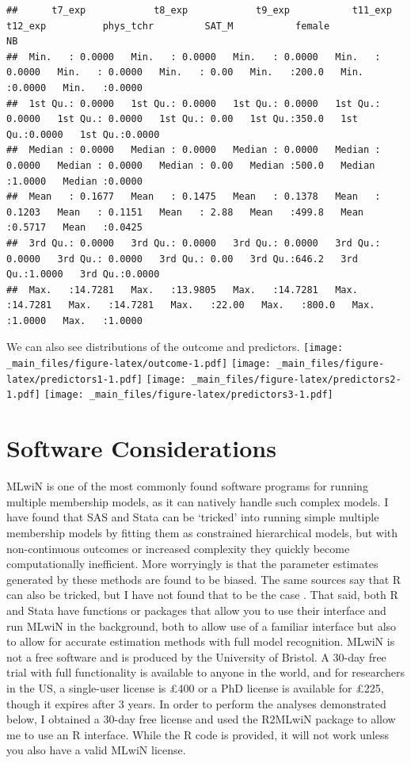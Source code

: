 \documentclass[
]{book}
\begin{document}
\begin{verbatim}
##      t7_exp            t8_exp            t9_exp           t11_exp           t12_exp          phys_tchr         SAT_M           female             NB        
##  Min.   : 0.0000   Min.   : 0.0000   Min.   : 0.0000   Min.   : 0.0000   Min.   : 0.0000   Min.   : 0.00   Min.   :200.0   Min.   :0.0000   Min.   :0.0000  
##  1st Qu.: 0.0000   1st Qu.: 0.0000   1st Qu.: 0.0000   1st Qu.: 0.0000   1st Qu.: 0.0000   1st Qu.: 0.00   1st Qu.:350.0   1st Qu.:0.0000   1st Qu.:0.0000  
##  Median : 0.0000   Median : 0.0000   Median : 0.0000   Median : 0.0000   Median : 0.0000   Median : 0.00   Median :500.0   Median :1.0000   Median :0.0000  
##  Mean   : 0.1677   Mean   : 0.1475   Mean   : 0.1378   Mean   : 0.1203   Mean   : 0.1151   Mean   : 2.88   Mean   :499.8   Mean   :0.5717   Mean   :0.0425  
##  3rd Qu.: 0.0000   3rd Qu.: 0.0000   3rd Qu.: 0.0000   3rd Qu.: 0.0000   3rd Qu.: 0.0000   3rd Qu.: 0.00   3rd Qu.:646.2   3rd Qu.:1.0000   3rd Qu.:0.0000  
##  Max.   :14.7281   Max.   :13.9805   Max.   :14.7281   Max.   :14.7281   Max.   :14.7281   Max.   :22.00   Max.   :800.0   Max.   :1.0000   Max.   :1.0000
\end{verbatim}

We can also see distributions of the outcome and predictors.
\texttt{[image: \_main\_files/figure-latex/outcome-1.pdf]}
\texttt{[image: \_main\_files/figure-latex/predictors1-1.pdf]}
\texttt{[image: \_main\_files/figure-latex/predictors2-1.pdf]}
\texttt{[image: \_main\_files/figure-latex/predictors3-1.pdf]}

\hypertarget{software}{%
\section{Software Considerations}\label{software}}

MLwiN\citep{MLwiN} is one of the most commonly found software programs for running multiple membership models, as it can natively handle such complex models. I have found that SAS and Stata can be `tricked' into running simple multiple membership models by fitting them as constrained hierarchical models, but with non-continuous outcomes or increased complexity they quickly become computationally inefficient. More worryingly is that the parameter estimates generated by these methods are found to be biased. The same sources say that R can also be tricked, but I have not found that to be the case \citep{Stata2013}. That said, both R and Stata have functions or packages that allow you to use their interface and run MLwiN in the background, both to allow use of a familiar interface but also to allow for accurate estimation methods with full model recognition. MLwiN is not a free software and is produced by the University of Bristol. A 30-day free trial with full functionality is available to anyone in the world, and for researchers in the US, a single-user license is £400 or a PhD license is available for £225, though it expires after 3 years. In order to perform the analyses demonstrated below, I obtained a 30-day free license and used the R2MLwiN \citep{R-R2MLwiN} package to allow me to use an R interface. While the R code is provided, it will not work unless you also have a valid MLwiN license.
\end{document}
